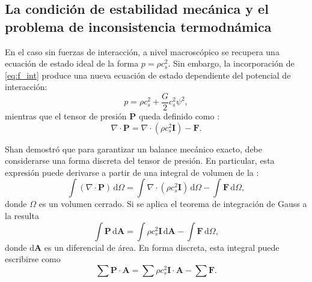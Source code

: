 \subsection{}







\subsection{La condici\'on de estabilidad mec\'anica y el problema de inconsistencia termodn\'amica}

En el caso sin fuerzas de interacci\'on, a nivel macrosc\'opico se recupera una ecuaci\'on de estado ideal de la forma $p=\rho c_s^2$. Sin embargo, la incorporaci\'on de \ref{eq:f_int} produce una nueva ecuaci\'on de estado dependiente del potencial de interacci\'on:
\begin{equation}
	p = \rho c_s^2 + \dfrac{G}{2} c_s^2 \psi ^2,
\end{equation}
mientras que el tensor de presi\'on $\bm{P}$ queda definido como \cite{he_thermodynamic_2002}:
\begin{equation}
	\nabla \cdot \bm{P} = \nabla \cdot (\rho c_s^2 \bm{I}) - \bm{F}.
	\label{eq:ptens}
\end{equation}

Shan \cite{shan_pressure_2008} demostr\'o que para garantizar un balance mec\'anico exacto, debe considerarse una forma discreta del tensor de presi\'on. En particular, esta expresi\'on puede derivarse a partir de una integral de volumen de la :
\begin{equation}
	\int (\nabla \cdot \bm{P}) \, \mbox{d}\Omega = \int \nabla \cdot (\rho c_s^2 \bm{I})\, \mbox{d}\Omega - \int \bm{F} \, \mbox{d}\Omega,
	\label{eq:integral_pres}
\end{equation}
donde $\Omega$ es un volumen cerrado. Si se aplica el teorema de integraci\'on de Gauss a la  resulta
\begin{equation}
	\int \bm{P} \, \mbox{d} \bm{A} = \int \rho c_s^2 \bm{I}\, \mbox{d} \bm{A} - \int \bm{F} \, \mbox{d}\Omega,
\end{equation}
donde $\mbox{d} \bm{A}$ es un diferencial de \'area. En forma discreta, esta integral puede escribirse como
\begin{equation}
	\sum \bm{P} \cdot \bm{A} = \sum \rho c_s^2 \bm{I} \cdot \bm{A} - \sum \bm{F}.
\end{equation}

